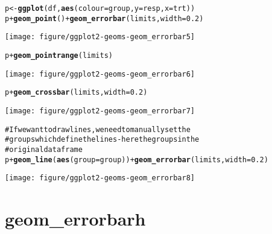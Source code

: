 \documentclass[a4paper,titlepage]{tufte-handout}\usepackage{graphicx, color}
\makeatletter
\def\maxwidth{ %
  \ifdim\Gin@nat@width>\linewidth
    \linewidth
  \else
    \Gin@nat@width
  \fi
}
\newcommand{\hlfunctioncall}[1]{\textcolor[rgb]{0.501960784313725,0,0.329411764705882}{\textbf{#1}}}%
\newcommand{\hlcomment}[1]{\textcolor[rgb]{0.180392156862745,0.6,0.341176470588235}{#1}}%
\newenvironment{kframe}{%
 \def\at@end@of@kframe{}%
 \ifinner\ifhmode%
  \def\at@end@of@kframe{\end{minipage}}%
  \begin{minipage}{\columnwidth}%
 \fi\fi%
 \def\FrameCommand##1{\hskip\@totalleftmargin \hskip-\fboxsep
 \colorbox{shadecolor}{##1}\hskip-\fboxsep
     \hskip-\linewidth \hskip-\@totalleftmargin \hskip\columnwidth}%
 \MakeFramed {\advance\hsize-\width
   \@totalleftmargin\z@ \linewidth\hsize
   \@setminipage}}%
 {\par\unskip\endMakeFramed%
 \at@end@of@kframe}
\newenvironment{knitrout}{}{} %
\makeatother
\begin{document}
\begin{knitrout}
\begin{kframe}
\begin{alltt}
p <- \hlfunctioncall{ggplot}(df, \hlfunctioncall{aes}(colour=group, y=resp, x=trt))
p + \hlfunctioncall{geom_point}() + \hlfunctioncall{geom_errorbar}(limits, width=0.2)
\end{alltt}
\end{kframe}\texttt{[image: figure/ggplot2-geoms-geom\_errorbar5]} \begin{kframe}\begin{alltt}
p + \hlfunctioncall{geom_pointrange}(limits)
\end{alltt}
\end{kframe}\texttt{[image: figure/ggplot2-geoms-geom\_errorbar6]} \begin{kframe}\begin{alltt}
p + \hlfunctioncall{geom_crossbar}(limits, width=0.2)
\end{alltt}
\end{kframe}\texttt{[image: figure/ggplot2-geoms-geom\_errorbar7]} \begin{kframe}\begin{alltt}
\hlcomment{# If we want to draw lines, we need to manually set the}
\hlcomment{# groups which define the lines - here the groups in the}
\hlcomment{# original dataframe}
p + \hlfunctioncall{geom_line}(\hlfunctioncall{aes}(group=group)) + \hlfunctioncall{geom_errorbar}(limits, width=0.2)
\end{alltt}
\end{kframe}\texttt{[image: figure/ggplot2-geoms-geom\_errorbar8]} 
\end{knitrout}


\section{geom\_errorbarh}
\end{document}
